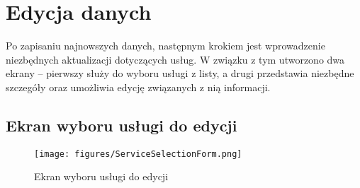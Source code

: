 \section{Edycja danych}

Po zapisaniu najnowszych danych, następnym krokiem jest wprowadzenie niezbędnych aktualizacji dotyczących usług. W związku z tym utworzono dwa ekrany -- pierwszy służy do wyboru usługi z listy, a drugi przedstawia niezbędne szczegóły oraz umożliwia edycję związanych z nią informacji.

\subsection{Ekran wyboru usługi do edycji}

\begin{figure}[h]
    \centering
    \texttt{[image: figures/ServiceSelectionForm.png]}
    \caption{Ekran wyboru usługi do edycji}  
    \label{fig:ServiceSelectionForm}
\end{figure}

\begin{comment}

Ekran wyboru elementu do obróbki składa się z: \begin{enumerate}
    \item listy, przedstawiającej dane z tymczasowej kolekcji \textit{MergedData}, utworzonej specjalnie na potrzeby obsługi wyboru danych do edycji,
    \item pól wyszukiwania i filtrów, umożliwiających zawężenie listy na podstawie nazwy usługi, identyfikatora (\textit{Service ID}), miejsca powstawania kosztów (\textit{MPK}) oraz statusu decyzji (\textit{Accepted}, \textit{Not Accepted}, \textit{No Status}),
    \item wykresu kołowego, prezentującego wizualne podsumowanie liczby elementów w każdej kategorii statusu decyzji,
    \item interfejsu umożliwiającego dynamiczne dopasowanie wyników listy w czasie rzeczywistym, na podstawie wprowadzonych kryteriów wyszukiwania,
    \item nagłówka, który przedstawia kontekst użytkownika, w tym nazwę i dane aktualnie zalogowanego użytkownika. \end{enumerate}
\end{comment}

